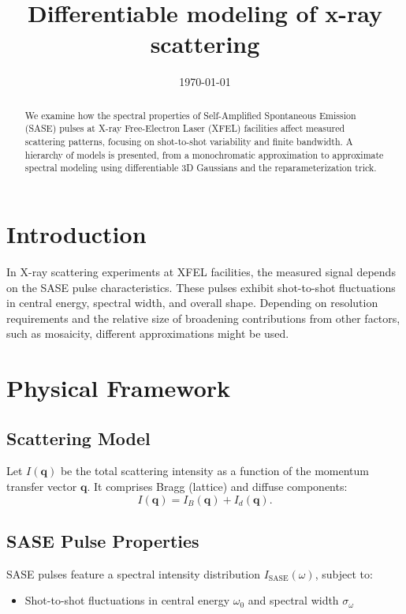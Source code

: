 \documentclass[12pt,a4paper]{article}
\title{Differentiable modeling of x-ray scattering}
\date{\today}
\begin{document}
\maketitle

\begin{abstract}
We examine how the spectral properties of Self-Amplified Spontaneous Emission (SASE) pulses at X-ray Free-Electron Laser (XFEL) facilities affect measured scattering patterns, focusing on shot-to-shot variability and finite bandwidth. A hierarchy of models is presented, from a monochromatic approximation to approximate spectral modeling using differentiable 3D Gaussians and the reparameterization trick.
\end{abstract}

\section{Introduction}
In X-ray scattering experiments at XFEL facilities, the measured signal depends on the SASE pulse characteristics. These pulses exhibit shot-to-shot fluctuations in central energy, spectral width, and overall shape. Depending on resolution requirements and the relative size of broadening contributions from other factors, such as mosaicity, different approximations might be used.

\section{Physical Framework}

\subsection{Scattering Model}
Let $I(\mathbf{q})$ be the total scattering intensity as a function of the momentum transfer vector $\mathbf{q}$. It comprises Bragg (lattice) and diffuse components:
\begin{equation}
I(\mathbf{q}) = I_B(\mathbf{q}) + I_d(\mathbf{q}).
\end{equation}

\subsection{SASE Pulse Properties}
SASE pulses feature a spectral intensity distribution $I_{\text{SASE}}(\omega)$, subject to:
\begin{itemize}
    \item Shot-to-shot fluctuations in central energy $\omega_0$ and spectral width $\sigma_\omega$
\end{itemize}
\end{document}
